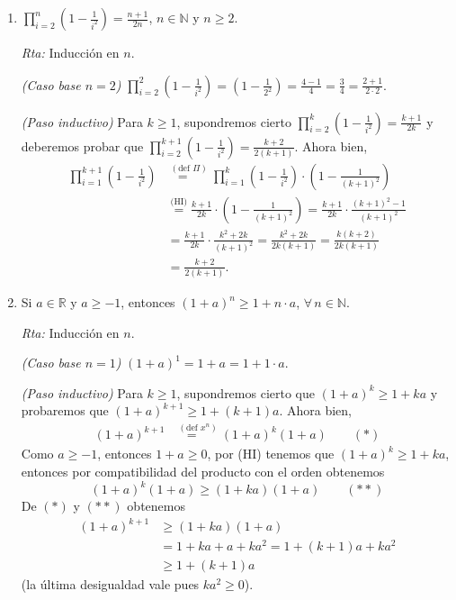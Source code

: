 \documentclass[a4paper,12pt,twoside,spanish,reqno]{amsbook}
\numberwithin{equation}{section}
\newcommand{\rta}{\noindent\textit{Rta: }}
\begin{document}
\begin{enumerate}
\begin{enumerate}
            
            \item $\displaystyle{ \prod_{i=2}^n \left(1-\frac{1}{i^2}\right) = \frac{n+1}{2n}}$, $n\in \mathbb N$ y $ n\ge 2$.
            
            \rta Inducción en $n$.
            
            \textit{(Caso base $n=2$) } $\prod_{i=2}^2 \left(1-\frac{1}{i^2}\right) = (1- \frac{1}{2^2}) = \frac{4-1}{4} = \frac{3}{4} = \frac{2+1}{2 \cdot 2}$.
            
            \textit{(Paso inductivo) } Para  $k \ge 1$,  supondremos cierto $\prod_{i=2}^k \left(1-\frac{1}{i^2}\right) = \frac{k+1}{2k}$ y  deberemos probar  que $\prod_{i=2}^{k+1} \left(1-\frac{1}{i^2}\right) = \frac{k+2}{2(k+1)}$. Ahora bien,
            \begin{align*}
            \prod_{i=1}^{k+1}\left(1-\frac{1}{i^2}\right) &\overset{(\text{def } \Pi)}{=\quad} \prod_{i=1}^k \left(1-\frac{1}{i^2}\right) \cdot \left(1-\frac{1}{(k+1)^2}\right)\\ &\overset{\text{(HI)}}{=}  \frac{k+1}{2k} \cdot\left(1-\frac{1}{(k+1)^2}\right)
            =  \frac{k+1}{2k} \cdot\frac{(k+1)^2- 1}{(k+1)^2} \\
            &= \frac{k+1}{2k} \cdot\frac{k^2+2k}{(k+1)^2} = \frac{k^2+2k}{2k (k+1)} = \frac{k(k+2)}{2k (k+1)} \\
            &=  \frac{k+2}{2 (k+1)}.
            \end{align*}
            
            \item Si $a\in \mathbb R$ y $a\geq -1$, entonces $(1+a)^n\geq 1+n\cdot a$, $\forall \, n \in \mathbb N$.
            
            \rta Inducción en $n$.
            
            \textit{(Caso base $n=1$) } $(1+a)^1 = 1+a = 1+ 1\cdot a$. 
            
            \textit{(Paso inductivo) }  Para  $k \ge 1$,  supondremos cierto que $(1+a)^k\geq 1+k a$ y probaremos  que $(1+a)^{k+1}\geq 1+(k+1) a$. Ahora bien, 
            \begin{align*}
            (1+a)^{k+1} &\overset{(\text{def } x^n)}{=\quad} (1+a)^k(1+a) \qquad (*)
            \end{align*}
            Como $a\ge -1$, entonces $1+a \ge 0$, por (HI) tenemos  que $(1+a)^k\geq 1+k a$, entonces  por compatibilidad del  producto con el orden obtenemos
            \begin{equation*}
                (1+a)^k(1+a) \ge   (1+k a)(1+a)  \qquad (**)
            \end{equation*}
            De $(*)$ y $(**)$ obtenemos
            \begin{align*}
            (1+a)^{k+1} &\ge (1+k a)(1+a) \\
            &= 1+ ka + a + ka^2 = 1 + (k+1)a + ka^2 \\
            &\ge 1 + (k+1)a
            \end{align*}
            (la última desigualdad vale pues $ka^2 \ge 0$). 
            

\end{enumerate}
\end{enumerate}
\end{document}
